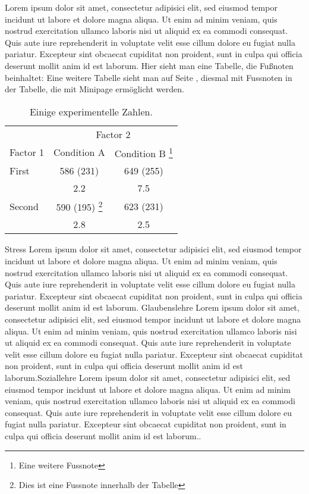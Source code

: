Lorem ipsum dolor sit amet, consectetur adipisici elit, sed eiusmod tempor incidunt ut labore et dolore magna aliqua. Ut enim ad minim veniam, quis nostrud exercitation ullamco laboris nisi ut aliquid ex ea commodi consequat. Quis aute iure reprehenderit in voluptate velit esse cillum dolore eu fugiat nulla pariatur. Excepteur sint obcaecat cupiditat non proident, sunt in culpa qui officia deserunt mollit anim id est laborum.
Hier sieht man eine Tabelle, die Fußnoten beinhaltet:
Eine weitere Tabelle sieht man auf Seite \pageref{tab:tab2}, diesmal mit Fussnoten in der Tabelle, die mit Minipage ermöglicht werden.
\begin{table}[htb]
\begin{minipage}{\linewidth}
\renewcommand{\footnoterule}{}
\renewcommand{\thefootnote}{\alph{footnote}}
\caption{Einige experimentelle Zahlen.}
\label{tab:tab2}
\centering
\begin{tabular}{lcc}
\toprule
          & \multicolumn{2}{c}{Factor 2} \\ 
          	\cmidrule{2-3}
Factor 1  & Condition A  & Condition B \footnote{Eine weitere Fussnote}  \\ 
\midrule
First     & 586 (231)    & 649 (255)     \\
          &    2.2       &    7.5        \\
Second    & 590 (195) \footnote{Dies ist eine Fussnote innerhalb der Tabelle}   & 623 (231)     \\
          &    2.8       &    2.5        \\ 
\bottomrule
\end{tabular}
\end{minipage}
\end{table}

 Stress Lorem ipsum dolor sit amet, consectetur adipisici elit, sed eiusmod tempor incidunt ut labore et dolore magna aliqua. Ut enim ad minim veniam, quis nostrud exercitation ullamco laboris nisi ut aliquid ex ea commodi consequat. Quis aute iure reprehenderit in voluptate velit esse cillum dolore eu fugiat nulla pariatur. Excepteur sint obcaecat cupiditat non proident, sunt in culpa qui officia deserunt mollit anim id est laborum. Glaubenslehre  Lorem ipsum dolor sit amet, consectetur adipisici elit, sed eiusmod tempor incidunt ut labore et dolore magna aliqua. Ut enim ad minim veniam, quis nostrud exercitation ullamco laboris nisi ut aliquid ex ea commodi consequat. Quis aute iure reprehenderit in voluptate velit esse cillum dolore eu fugiat nulla pariatur. Excepteur sint obcaecat cupiditat non proident, sunt in culpa qui officia deserunt mollit anim id est laborum.Soziallehre  Lorem ipsum dolor sit amet, consectetur adipisici elit, sed eiusmod tempor incidunt ut labore et dolore magna aliqua. Ut enim ad minim veniam, quis nostrud exercitation ullamco laboris nisi ut aliquid ex ea commodi consequat. Quis aute iure reprehenderit in voluptate velit esse cillum dolore eu fugiat nulla pariatur. Excepteur sint obcaecat cupiditat non proident, sunt in culpa qui officia deserunt mollit anim id est laborum..

